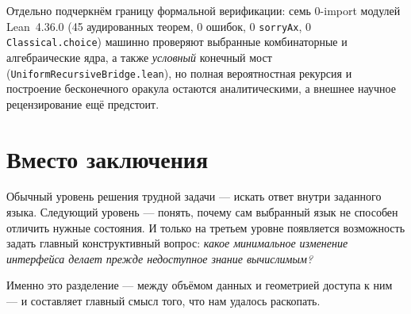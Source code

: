 \documentclass[11pt,a4paper]{article}
\begin{document}
Отдельно подчеркнём границу формальной верификации: семь 0-import модулей Lean~4.36.0 (45 аудированных теорем, 0 ошибок, 0 \texttt{sorryAx}, 0 \texttt{Classical.choice}) машинно проверяют выбранные комбинаторные и алгебраические ядра, а также \emph{условный} конечный мост (\texttt{UniformRecursiveBridge.lean}), но полная вероятностная рекурсия и построение бесконечного оракула остаются аналитическими, а внешнее научное рецензирование ещё предстоит.

\section{Вместо заключения}

Обычный уровень решения трудной задачи — искать ответ внутри заданного языка. Следующий уровень — понять, почему сам выбранный язык не способен отличить нужные состояния. И только на третьем уровне появляется возможность задать главный конструктивный вопрос: \emph{какое минимальное изменение интерфейса делает прежде недоступное знание вычислимым?}

Именно это разделение — между объёмом данных и геометрией доступа к ним — и составляет главный смысл того, что нам удалось раскопать.
\end{document}
